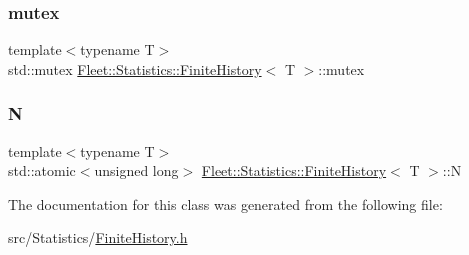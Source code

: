 \mbox{\label{class_fleet_1_1_statistics_1_1_finite_history_abae96d2bf212abbf0bcfb74ac41b7165}} 
\subsubsection{\texorpdfstring{mutex}{mutex}}
{\footnotesize\ttfamily template$<$typename T$>$ \\
std\+::mutex \hyperlink{class_fleet_1_1_statistics_1_1_finite_history}{Fleet\+::\+Statistics\+::\+Finite\+History}$<$ T $>$\+::mutex\hspace{0.3cm}{\ttfamily [mutable]}}

\mbox{\label{class_fleet_1_1_statistics_1_1_finite_history_a67d34a239140f65d8ca07de2a10c45c9}} 
\subsubsection{\texorpdfstring{N}{N}}
{\footnotesize\ttfamily template$<$typename T$>$ \\
std\+::atomic$<$unsigned long$>$ \hyperlink{class_fleet_1_1_statistics_1_1_finite_history}{Fleet\+::\+Statistics\+::\+Finite\+History}$<$ T $>$\+::N}



The documentation for this class was generated from the following file\+:\begin{DoxyCompactItemize}
\item 
src/\+Statistics/\hyperlink{_finite_history_8h}{Finite\+History.\+h}\end{DoxyCompactItemize}
